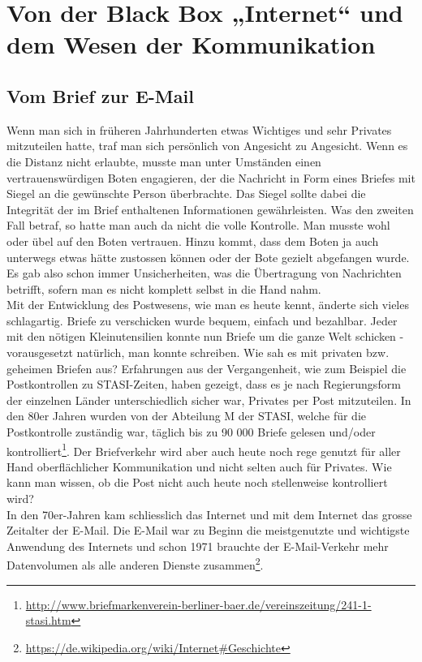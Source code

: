 \newpage
\section{Von der Black Box „Internet“ und dem Wesen der Kommunikation}

\subsection{Vom Brief zur E-Mail}
Wenn man sich in früheren Jahrhunderten etwas Wichtiges und sehr Privates mitzuteilen hatte, traf man sich persönlich von Angesicht zu Angesicht. Wenn es die Distanz nicht erlaubte, musste man unter Umständen einen vertrauenswürdigen Boten engagieren, der die Nachricht in Form eines Briefes mit Siegel an die gewünschte Person überbrachte. Das Siegel sollte dabei die Integrität der im Brief enthaltenen Informationen gewährleisten. Was den zweiten Fall betraf, so hatte man auch da nicht die volle Kontrolle. Man musste wohl oder übel auf den Boten vertrauen. Hinzu kommt, dass dem Boten ja auch unterwegs etwas hätte zustossen können oder der Bote gezielt abgefangen wurde. Es gab also schon immer Unsicherheiten, was die Übertragung von Nachrichten betrifft, sofern man es nicht komplett selbst in die Hand nahm. 
\\
Mit der Entwicklung des Postwesens, wie man es heute kennt, änderte sich vieles schlagartig. Briefe zu verschicken wurde bequem, einfach und bezahlbar. Jeder mit den nötigen Kleinutensilien konnte nun Briefe um die ganze Welt schicken - vorausgesetzt natürlich, man konnte schreiben. Wie sah es mit privaten bzw. geheimen Briefen aus? Erfahrungen aus der Vergangenheit, wie zum Beispiel die Postkontrollen zu STASI-Zeiten, haben gezeigt, dass es je nach Regierungsform der einzelnen Länder unterschiedlich sicher war, Privates per Post mitzuteilen. In den 80er Jahren wurden von der Abteilung M der STASI, welche für die Postkontrolle zuständig war, täglich bis zu 90 000 Briefe gelesen und/oder kontrolliert\footnote{\url{http://www.briefmarkenverein-berliner-baer.de/vereinszeitung/241-1-stasi.htm}}.
Der Briefverkehr wird aber auch heute noch rege genutzt für aller Hand oberflächlicher Kommunikation und nicht selten auch für Privates. Wie kann man wissen, ob die Post nicht auch heute noch stellenweise kontrolliert wird?
\\
In den 70er-Jahren kam schliesslich das Internet und mit dem Internet das grosse Zeitalter der E-Mail. Die E-Mail war zu Beginn die meistgenutzte und wichtigste Anwendung des Internets und schon 1971 brauchte der E-Mail-Verkehr mehr Datenvolumen als alle anderen Dienste zusammen\footnote{\url{https://de.wikipedia.org/wiki/Internet\#Geschichte}}.
